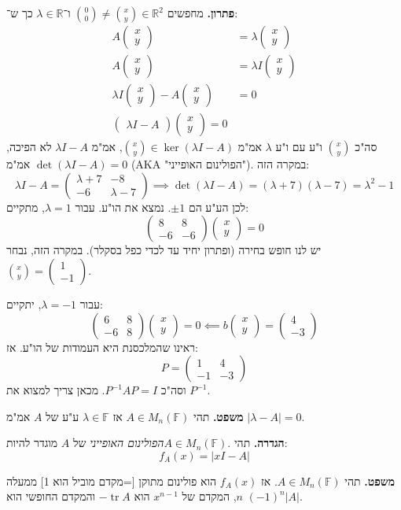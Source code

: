 \documentclass[]{article}
\newcommand\R     {\mathbb{R}}
\newcommand\F         {\mathbb{F}}
\newcommand\pms[1]    {\begin{pmatrix}
		#1
\end{pmatrix}}
\DeclareMathOperator{\tr}     {tr}
\renewcommand\lg      {\lambda}
\newcommand\op    {^{-1}}
\begin{document}
	\textbf{פתרון. }מחפשים $\binom{0}{0} \neq \binom{x}{y} \in \R^2$ ו־$\lg \in \R$ כך ש־: 
	\begin{align*}
		A\pms{x \\ y} &= \lg \pms{x \\ y} \\
		A\pms{x \\ y} &= \lg I \pms{x \\ y} \\
		\lg I \pms{x \\ y} - A \pms{x \\ y} &= 0 \\
		\pms{\lg I - A} \pms{x \\ y} = 0
	\end{align*}
	סה"כ $\binom{x}{y}$ ו"ע עם ו"ע $\lg$ אמ"מ $\binom{x}{y} \in \ker (\lg I - A)$, אמ"מ $\lg I - A$ לא הפיכה, אמ"מ $\det(\lg I - A) = 0$ (AKA "הפולינום האופייני"). במקרה הזה: 
	\[ \lg I - A = \pms{\lg + 7 & -8 \\ -6 & \lg - 7} \implies \det(\lg I - A) = (\lg + 7)(\lg - 7) = \lg^2 - 1 \]
	לכן הע"ע הם $\pm 1$. נמצא את הו"ע. עבור $\lg = 1$, מתקיים: 
	\[ \pms{8 & 8 \\ -6 & -6}\pms{x \\ y} = 0 \]
	יש לנו חופש בחירה (ופתרון יחיד עד לכדי כפל בסקלר). במקרה הזה, נבחר $\binom{x}{y} = \pms{1 \\ -1}$. 
	
	עבור $\lg = -1$, יתקיים: 
	\[ \pms{6 & 8 \\ -6 & 8}\pms{x \\ y} = 0 \impliedby b\pms{x \\ y} = \pms{4 \\ -3} \]
	ראינו שהמלכסנת היא העמודות של הו"ע. אז: 
	\[ P = \pms{1 & 4 \\ -1 & -3} \]
	וסה"כ $P\op A P = I$. מכאן צריך למצוא את $P\op$. 
	
	\textbf{משפט. }תהי $A \in M_n(\F)$ אז $\lg \in \F$ ע"ע של $A$ אמ"מ $|\lg - A| = 0$. 
	
	\textbf{הגדרה. }תהי $A \in M_n(\F). $\textit{הפולינום האופייני} של $A$ מוגדר להיות: 
	\[ f_A(x) = |xI - A| \]
	
	\textbf{משפט. }תהי $A \in M_n(\F)$. אז $f_A(x)$ הוא פולינום מתוקן [=מקדם מוביל הוא 1] ממעלה $n$, המקדם של $x^{n - 1}$ הוא $- \tr A$ והמקדם החופשי הוא $(-1)^{n}|A|$. 
	
	
	
	
\end{document}
